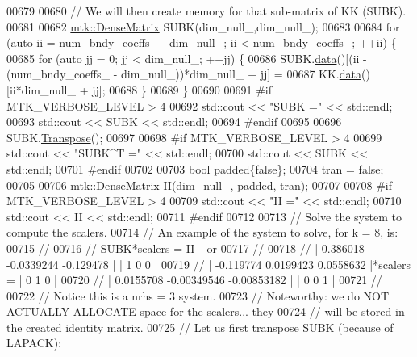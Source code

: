 \begin{DoxyCode}
{{00679 
00680   \textcolor{comment}{// We will then create memory for that sub-matrix of KK (SUBK).}
00681 
00682   \hyperlink{classmtk_1_1DenseMatrix}{mtk::DenseMatrix} SUBK(dim\_null\_,dim\_null\_);
00683 
00684   \textcolor{keywordflow}{for} (\textcolor{keyword}{auto} ii = num\_bndy\_coeffs\_ - dim\_null\_; ii < num\_bndy\_coeffs\_; ++ii) \{
00685     \textcolor{keywordflow}{for} (\textcolor{keyword}{auto} jj = 0; jj < dim\_null\_; ++jj) \{
00686       SUBK.\hyperlink{classmtk_1_1DenseMatrix_a0c33b8a9e01d157c61ddbdf807c25d84}{data}()[(ii - (num\_bndy\_coeffs\_ - dim\_null\_))*dim\_null\_ + jj] =
00687           KK.\hyperlink{classmtk_1_1DenseMatrix_a0c33b8a9e01d157c61ddbdf807c25d84}{data}()[ii*dim\_null\_ + jj];
00688     \}
00689   \}
00690 
00691 \textcolor{preprocessor}{  #if MTK\_VERBOSE\_LEVEL > 4}
00692   std::cout << \textcolor{stringliteral}{"SUBK ="} << std::endl;
00693   std::cout << SUBK << std::endl;
00694 \textcolor{preprocessor}{  #endif}
00695 
00696   SUBK.\hyperlink{classmtk_1_1DenseMatrix_a71d9c07ca66e88d97d1fd5012f43138b}{Transpose}();
00697 
00698 \textcolor{preprocessor}{  #if MTK\_VERBOSE\_LEVEL > 4}
00699   std::cout << \textcolor{stringliteral}{"SUBK^T ="} << std::endl;
00700   std::cout << SUBK << std::endl;
00701 \textcolor{preprocessor}{  #endif}
00702 
00703   \textcolor{keywordtype}{bool} padded\{\textcolor{keyword}{false}\};
00704   tran = \textcolor{keyword}{false};
00705 
00706   \hyperlink{classmtk_1_1DenseMatrix}{mtk::DenseMatrix} II(dim\_null\_, padded, tran);
00707 
00708 \textcolor{preprocessor}{  #if MTK\_VERBOSE\_LEVEL > 4}
00709   std::cout << \textcolor{stringliteral}{"II ="} << std::endl;
00710   std::cout << II << std::endl;
00711 \textcolor{preprocessor}{  #endif}
00712 
00713   \textcolor{comment}{// Solve the system to compute the scalers.}
00714   \textcolor{comment}{// An example of the system to solve, for k = 8, is:}
00715   \textcolor{comment}{//}
00716   \textcolor{comment}{// SUBK*scalers = II\_ or}
00717   \textcolor{comment}{//}
00718   \textcolor{comment}{// |  0.386018  -0.0339244   -0.129478 |           | 1 0 0 |}
00719   \textcolor{comment}{// | -0.119774   0.0199423   0.0558632 |*scalers = | 0 1 0 |}
00720   \textcolor{comment}{// | 0.0155708 -0.00349546 -0.00853182 |           | 0 0 1 |}
00721   \textcolor{comment}{//}
00722   \textcolor{comment}{// Notice this is a nrhs = 3 system.}
00723   \textcolor{comment}{// Noteworthy: we do NOT ACTUALLY ALLOCATE space for the scalers... they}
00724   \textcolor{comment}{// will be stored in the created identity matrix.}
00725   \textcolor{comment}{// Let us first transpose SUBK (because of LAPACK):}
}}
\end{DoxyCode}
